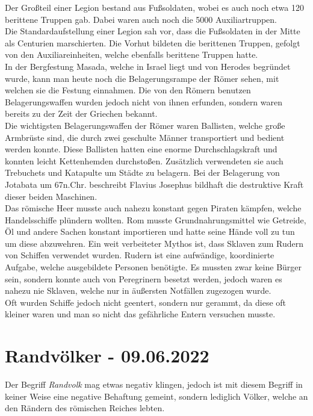 \documentclass{article}
\begin{document}
	Der Großteil einer Legion bestand aus Fußsoldaten, wobei es auch noch etwa 120 berittene Truppen gab. Dabei waren auch noch die 5000 Auxiliartruppen. \\
	Die Standardaufstellung einer Legion sah vor, dass die Fußsoldaten in der Mitte als Centurien marschierten. Die Vorhut bildeten die berittenen Truppen, gefolgt von den Auxiliareinheiten, welche ebenfalls berittene Truppen hatte. \\
	In der Bergfestung Masada, welche in Israel liegt und von Herodes begründet wurde, kann man heute noch die Belagerungsrampe der Römer sehen, mit welchen sie die Festung einnahmen. Die von den Römern benutzen Belagerungswaffen wurden jedoch nicht von ihnen erfunden, sondern waren bereits zu der Zeit der Griechen bekannt. \\
	Die wichtigsten Belagerungswaffen der Römer waren Ballisten, welche große Armbrüste sind, die durch zwei geschulte Männer transportiert und bedient werden konnte. Diese Ballisten hatten eine enorme Durchschlagskraft und konnten leicht Kettenhemden durchstoßen. Zusätzlich verwendeten sie auch Trebuchets und Katapulte um Städte zu belagern. Bei der Belagerung von Jotabata um 67n.Chr. beschreibt Flavius Josephus bildhaft die destruktive Kraft dieser beiden Maschinen. \\
	Das römische Heer musste auch nahezu konstant gegen Piraten kämpfen, welche Handelsschiffe plündern wollten. Rom musste Grundnahrungsmittel wie Getreide, Öl und andere Sachen konstant importieren und hatte seine Hände voll zu tun um diese abzuwehren. Ein weit verbeiteter Mythos ist, dass Sklaven zum Rudern von Schiffen verwendet wurden. Rudern ist eine aufwändige, koordinierte Aufgabe, welche ausgebildete Personen benötigte. Es mussten zwar keine Bürger sein, sondern konnte auch von Peregrinern besetzt werden, jedoch waren es nahezu nie Sklaven, welche nur in äußersten Notfällen zugezogen wurde. \\
	Oft wurden Schiffe jedoch nicht geentert, sondern nur gerammt, da diese oft kleiner waren und man so nicht das gefährliche Entern versuchen musste.

	\section{Randvölker - 09.06.2022}

	Der Begriff \textit{Randvolk} mag etwas negativ klingen, jedoch ist mit diesem Begriff in keiner Weise eine negative Behaftung gemeint, sondern lediglich Völker, welche an den Rändern des römischen Reiches lebten.
\end{document}
